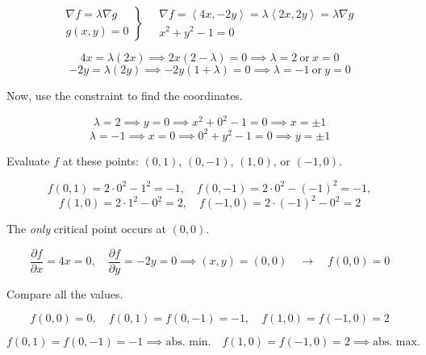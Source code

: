 \documentclass{article}
\begin{document}
\[
\left.
\begin{array}{ll}
\displaystyle\nabla f =\lambda \nabla g \\
\displaystyle g(x,y) = 0
\end{array}
\right\}\quad
\begin{array}{ll}
\nabla f=\left\langle4x,-2y\right\rangle = \lambda\left\langle2x,2y\right\rangle = \lambda\nabla g \\[0.1cm] x^2+y^2-1=0
\end{array}
\]

\[4x=\lambda(2x)\implies2x(2-\lambda)=0\implies\lambda=2\:\text{or}\:x=0\]
\[-2y=\lambda(2y)\implies-2y(1+\lambda)=0\implies\lambda=-1\:\text{or}\:y=0\]

\hfill

\noindent Now, use the constraint to find the coordinates.

\[\lambda=2\implies y=0\implies x^2+0^2-1=0\implies x=\pm1\]
\[\lambda=-1\implies x=0\implies 0^2+y^2-1=0\implies y=\pm1\]

\hfill

\noindent Evaluate $f$ at these points: $(0,1)$, $(0,-1)$, $(1,0)$, or $(-1,0)$.

\[f(0,1)=2\cdot0^2-1^2=-1,\quad f(0,-1) =2\cdot0^2-(-1)^2=-1,\]
\[f(1,0)=2\cdot1^2-0^2=2,\quad f(-1,0)=2\cdot(-1)^2-0^2=2\]

\hfill

\noindent The \textit{only} critical point occurs at $(0,0)$.

\[\frac{\partial f}{\partial x}=4x=0,\quad\frac{\partial f}{\partial y}=-2y=0\implies(x,y)=(0,0)\quad\rightarrow\quad f(0,0)=0\]

\hfill

\noindent Compare all the values.

\[f(0,0)=0,\quad f(0,1)=f(0,-1)=-1,\quad f(1,0)=f(-1,0)=2\]

\[\boxed{f(0,1)=f(0,-1)=-1\implies\text{abs. min.}\quad f(1,0)=f(-1,0)=2\implies\text{abs. max.}}\]

\hfill
\end{document}
